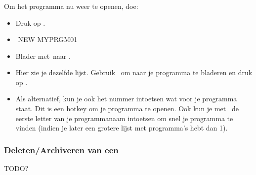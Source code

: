 \begin{frame}
\frametitle{ \tiPRGM}


Om het programma nu weer te openen, doe:
\begin{itemize}
  \item Druk op \tiPRGM.
  \pause %
  \item {}
	  \begin{ticalc}[3.25cm]
	  	\,\,NEW
	  	MYPRGM01
	  \end{ticalc}
  \pause %
  \item Blader met \tiRight\,naar .
  \pause %
  \item Hier zie je dezelfde lijst. Gebruik \tiDown\, om naar je programma te bladeren en druk op \tiENTER.
  \pause %
  \item Als alternatief, kun je ook het nummer intoetsen wat voor je programma staat. Dit is een hotkey om je programma te openen.
  \pause %
  		Ook kun je met \tiALPHA\, de eerste letter van je programmanaam intoetsen om snel je programma te vinden
  		(indien je later een grotere lijst met programma's hebt dan 1).
\end{itemize}
\end{frame}

\begin{frame}
\frametitle{Deleten/Archiveren van een \tiPRGM}
	TODO?
\end{frame}



